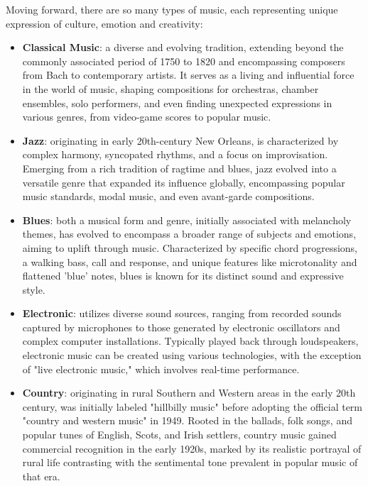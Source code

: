 Moving forward, there are so many types of music, each representing unique expression of culture, emotion and creativity:
\begin{itemize}
    \item \textbf{Classical Music}: a diverse and evolving tradition, extending beyond the commonly associated period of 1750 to 1820 and encompassing composers from Bach to contemporary artists. 
    It serves as a living and influential force in the world of music, shaping compositions for orchestras, chamber ensembles, solo performers, and even finding unexpected expressions in various genres, from video-game scores to popular music. \citep{gabler_2013_what} \nocite{pentreath_2022_why}
    \item \textbf{Jazz}: originating in early 20th-century New Orleans, is characterized by complex harmony, syncopated rhythms, and a focus on improvisation. 
    Emerging from a rich tradition of ragtime and blues, jazz evolved into a versatile genre that expanded its influence globally, encompassing popular music standards, modal music, and even avant-garde compositions.\citep{beek_2021_what}
    \item \textbf{Blues}: both a musical form and genre, initially associated with melancholy themes, has evolved to encompass a broader range of subjects and emotions, aiming to uplift through music.\citep{chaudhuri_2022_what}
    Characterized by specific chord progressions, a walking bass, call and response, and unique features like microtonality and flattened 'blue' notes, blues is known for its distinct sound and expressive style. \citep{bbc_2023_history}
    \item \textbf{Electronic}: utilizes diverse sound sources, ranging from recorded sounds captured by microphones to those generated by electronic oscillators and complex computer installations. 
    Typically played back through loudspeakers, electronic music can be created using various technologies, with the exception of "live electronic music," which involves real-time performance. \citep{hiller_2019_electronic}
    \item \textbf{Country}: originating in rural Southern and Western areas in the early 20th century, was initially labeled "hillbilly music" before adopting the official term "country and western music" in 1949. 
    Rooted in the ballads, folk songs, and popular tunes of English, Scots, and Irish settlers, country music gained commercial recognition in the early 1920s, marked by its realistic portrayal of rural life contrasting with the sentimental tone prevalent in popular music of that era. \citep{_2019_country} \nocite{_2021_country}

\end{itemize}
